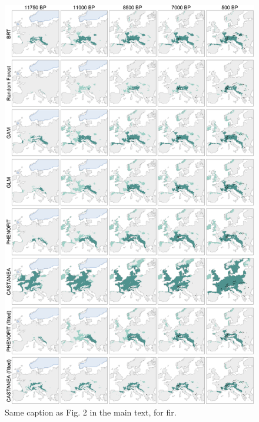 \documentclass[pdflatex, sn-nature, oneside]{sn-jnl}%
\begin{document}
\begin{figure}
\hspace*{-.3in}
\centering
\includegraphics{abies_simulations-1.pdf}
\caption{Same caption as Fig. 2 in the main text, for fir.}
\end{figure}
\end{document}
